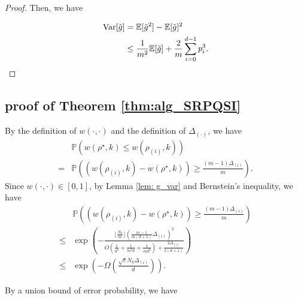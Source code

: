 \begin{proof}
    
    Then, we have
    
    \begin{equation}
        \begin{aligned}
            \mathrm{Var}[\tilde{g}] & = \mathbb{E}[\tilde{g}^2] - \mathbb{E}[\tilde{g}]^2\\
            & \leq \frac{1}{m^2} \mathbb{E}[\tilde{g}] + \frac{2}{m} \sum_{i=0}^{d-1} p_i^3.
        \end{aligned}
    \end{equation}

    \end{proof}

\subsection{proof of Theorem \ref{thm:alg_SRPQSI}}
\label{subsec:PQSI_alg1}

    By the definition of $w(\cdot,\cdot)$ and the definition of $\Delta_{(\cdot)}$, we have
    \begin{equation*}
        \begin{aligned}
            & \mathbb{P}(w({\rho^\star,k}) \leq w({\rho_{(i)},k})) \\
            = & \mathbb{P}\left( (w(\rho_{(i)},k) -  w(\rho^\star,k))  \geq \frac{(m-1)\Delta_{(i)}}{m}\right).
        \end{aligned}
    \end{equation*}
    Since $w(\cdot,\cdot) \in [0,1]$, by Lemma \ref{lem: g_var} and Bernstein's inequality, we have
    \begin{equation}
        \begin{aligned}
            & \mathbb{P}\left( (w(\rho_{(i)},k) -  w(\rho^\star,k))  \geq \frac{(m-1)\Delta_{(i)}}{m}\right) \\
            \leq & \exp\left(-\frac{\lfloor \frac{N_k}{m}\rfloor \left(\frac{m-1}{m(d+1)}\Delta_{(i)}\right)^2}{O(\frac{1}{d^3} + \frac{1}{m^2d} + \frac{1}{md^2}) + \frac{2\Delta_{(i)}}{3(d+1)}}\right) \\
            \leq & \exp\left( -\Omega\left( \frac{\sqrt{c}N_k \Delta_{(i)}}{d}\right)\right).
        \end{aligned}
    \end{equation}

    By a union bound of error probability, we have 

